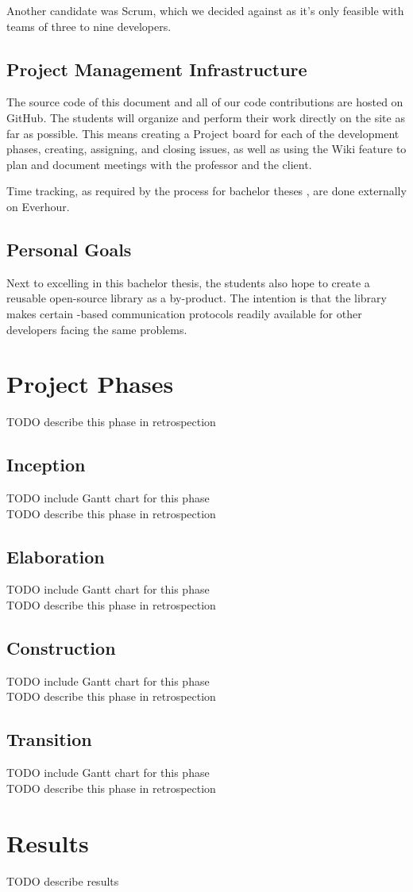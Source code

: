 Another candidate was Scrum, which we decided against as it’s only feasible
with teams of three to nine developers.

\section{Project Management Infrastructure}
The source code of this document and all of our code contributions are hosted
on GitHub. The students will organize and perform their work directly on the
site as far as possible. This means creating a Project board for each of the
development phases, creating, assigning, and closing issues, as well as using
the Wiki feature to plan and document meetings with the professor and the
client.

Time tracking, as required by the process for bachelor theses
\cite{hsr:thesis-rules}, are done externally on Everhour.

\section{Personal Goals}
Next to excelling in this bachelor thesis, the students also hope to create a
reusable open-source library as a by-product. The intention is that the library
makes certain \zmq-based communication protocols readily available for other
developers facing the same problems.

\chapter{Project Phases}
TODO describe this phase in retrospection\\

\section{Inception}
TODO include Gantt chart for this phase\\
TODO describe this phase in retrospection\\

\section{Elaboration}
TODO include Gantt chart for this phase\\
TODO describe this phase in retrospection\\

\section{Construction}
TODO include Gantt chart for this phase\\
TODO describe this phase in retrospection\\

\section{Transition}
TODO include Gantt chart for this phase\\
TODO describe this phase in retrospection\\

\chapter{Results}
TODO describe results\\
